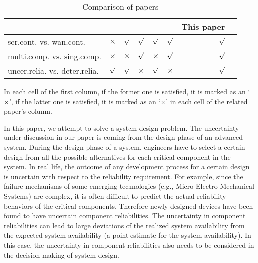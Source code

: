 \documentclass[preprint,12pt]{elsarticle}
\begin{document}
\begin{table}[htbp]
  \centering
  \caption{Comparison of papers}
    \begin{tabular}{lrrrrrrc}
    \toprule
          & \cite{Murthy1998} & \cite{Oner2010} & \cite{Oner2013} & \cite{Jin} & \cite{AlHanbali}  & This paper \\
    \midrule
    ser.cont. vs. wan.cont. & $\times$   & $\surd$     & $\surd$     & $\surd$    & $\surd$   & $\surd$ \\
    multi.comp. vs. sing.comp. & $\times$ & $\times$  & $\surd$ & $\times$       & $\surd$     & $\surd$ \\
    uncer.relia. vs. deter.relia.  & $\surd$ & $\surd$   & $\times$  & $\surd$    & $\times$ & $\surd$ \\
    \bottomrule
    \end{tabular}%
  \label{literature}%
   \begin{tablenotes}
      \footnotesize
      \item In each cell of the first column, if the former one is satisfied, it is marked as an `$\times$', if the latter one is satisfied, it is marked as an `$\times$' in each cell of the related paper's column.
    \end{tablenotes}
\end{table}%


In this paper, we attempt to solve a system design problem. The uncertainty under discussion in our paper is coming from  the design phase of an advanced system.  During the design phase of a system, engineers have to select a certain design from all the possible alternatives for each critical component in the system. In real life, the outcome of any development process for a certain design is uncertain with respect to the reliability requirement. For example, since the failure mechanisms of some emerging technologies (e.g., Micro-Electro-Mechanical Systems) are complex, it is often difficult to predict the actual reliability behaviors of the critical components. Therefore newly-designed devices have been found to have uncertain component reliabilities. The uncertainty in component reliabilities can lead to large deviations of the realized system availability from the expected system availability (a point estimate for the system availability). In this case, the uncertainty in component reliabilities also needs to be considered in the decision making of system design.
\end{document}
